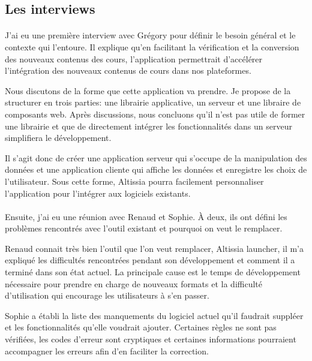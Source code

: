 \subsection{Les interviews}
\label{subsec:interviews}

\paragraph{}
J'ai eu une première interview avec Grégory pour définir le besoin général et le contexte qui l'entoure.
Il explique qu'en facilitant la vérification et la conversion des nouveaux contenus des cours, l'application permettrait d'accélérer l'intégration des nouveaux contenus de cours dans nos plateformes.

Nous discutons de la forme que cette application va prendre. 
Je propose de la structurer en trois parties: une librairie applicative, un serveur et une libraire de composants web.
Après discussions, nous concluons qu'il n'est pas utile de former une librairie et que de directement intégrer les fonctionnalités dans un serveur simplifiera le développement.

Il s'agit donc de créer une application serveur qui s'occupe de la manipulation des données et une application cliente qui affiche les données et enregistre les choix de l'utilisateur.
Sous cette forme, Altissia pourra facilement personnaliser\fnmark{} l'application pour l'intégrer aux logiciels existants.

\paragraph{}
Ensuite, j'ai eu une réunion avec Renaud et Sophie.
À deux, ils ont défini les problèmes rencontrés avec l'outil existant et pourquoi on veut le remplacer.

Renaud connait très bien l'outil que l'on veut remplacer, Altissia launcher, il m'a expliqué les difficultés rencontrées pendant son développement et comment il a terminé dans son état actuel.
La principale cause est le temps de développement nécessaire pour prendre en charge de nouveaux formats et la difficulté d'utilisation qui encourage les utilisateurs à s'en passer.

Sophie a établi la liste des manquements du logiciel actuel qu'il faudrait suppléer et les fonctionnalités qu'elle voudrait ajouter.
Certaines règles ne sont pas vérifiées, les codes d'erreur sont cryptiques et certaines informations pourraient accompagner les erreurs afin d'en faciliter la correction.

